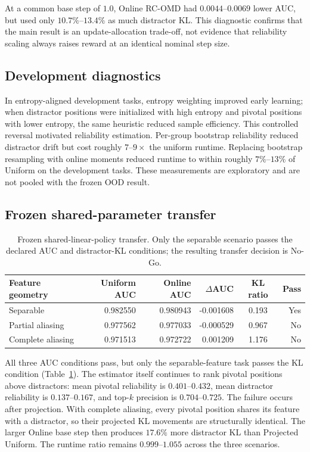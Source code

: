 \documentclass[10pt]{article}
\begin{document}
At a common base step of $1.0$, Online RC-OMD had $0.0044$--$0.0069$ lower AUC,
but used only $10.7\%$--$13.4\%$ as much distractor KL.  This diagnostic confirms
that the main result is an update-allocation trade-off, not evidence that
reliability scaling always raises reward at an identical nominal step size.

\subsection{Development diagnostics}

In entropy-aligned development tasks, entropy weighting improved early learning;
when distractor positions were initialized with high entropy and pivotal
positions with lower entropy, the same heuristic reduced sample efficiency.
This controlled reversal motivated reliability estimation.  Per-group bootstrap
reliability reduced distractor drift but cost roughly $7$--$9\times$ the uniform
runtime.  Replacing bootstrap resampling with online moments reduced runtime to
within roughly $7\%$--$13\%$ of Uniform on the development tasks.  These
measurements are exploratory and are not pooled with the frozen OOD result.

\subsection{Frozen shared-parameter transfer}

\begin{table}[t]
\centering
\small
\caption{Frozen shared-linear-policy transfer.  Only the separable scenario
passes the declared AUC and distractor-KL conditions; the resulting transfer
decision is No-Go.}
\label{tab:function}
\begin{tabular}{lrrrcr}
\toprule
Feature geometry & Uniform AUC & Online AUC & $\Delta$AUC & KL ratio & Pass\\
\midrule
Separable         & 0.982550 & 0.980943 & -0.001608 & 0.193 & Yes\\
Partial aliasing  & 0.977562 & 0.977033 & -0.000529 & 0.967 & No\\
Complete aliasing & 0.971513 & 0.972722 &  0.001209 & 1.176 & No\\
\bottomrule
\end{tabular}
\end{table}

All three AUC conditions pass, but only the separable-feature task passes the KL
condition (Table~\ref{tab:function}).  The estimator itself continues to rank
pivotal positions above distractors: mean pivotal reliability is
$0.401$--$0.432$, mean distractor reliability is $0.137$--$0.167$, and top-$k$
precision is $0.704$--$0.725$.  The failure occurs after projection.  With
complete aliasing, every pivotal position shares its feature with a distractor,
so their projected KL movements are structurally identical.  The larger Online
base step then produces $17.6\%$ more distractor KL than Projected Uniform.  The
runtime ratio remains $0.999$--$1.055$ across the three scenarios.
\end{document}
